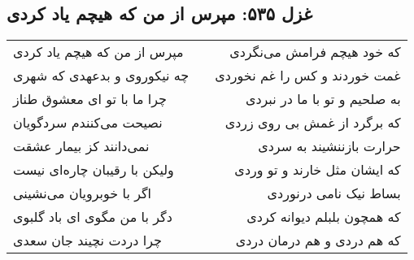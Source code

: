 \begin{center}
\section*{غزل ۵۳۵: مپرس از من که هیچم یاد کردی}
\label{sec:535}
\begin{longtable}{l p{0.5cm} r}
مپرس از من که هیچم یاد کردی
&&
که خود هیچم فرامش می‌نگردی
\\
چه نیکوروی و بدعهدی که شهری
&&
غمت خوردند و کس را غم نخوردی
\\
چرا ما با تو ای معشوق طناز
&&
به صلحیم و تو با ما در نبردی
\\
نصیحت می‌کنندم سردگویان
&&
که برگرد از غمش بی روی زردی
\\
نمی‌دانند کز بیمار عشقت
&&
حرارت بازننشیند به سردی
\\
ولیکن با رقیبان چاره‌ای نیست
&&
که ایشان مثل خارند و تو وردی
\\
اگر با خوبرویان می‌نشینی
&&
بساط نیک نامی درنوردی
\\
دگر با من مگوی ای باد گلبوی
&&
که همچون بلبلم دیوانه کردی
\\
چرا دردت نچیند جان سعدی
&&
که هم دردی و هم درمان دردی
\\
\end{longtable}
\end{center}
